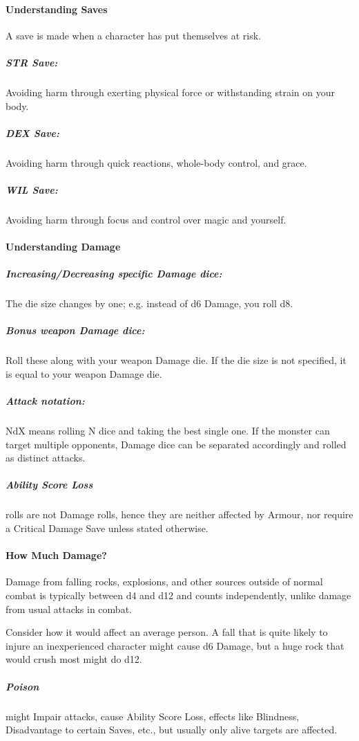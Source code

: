 \documentclass[itdr]{subfiles}
\begin{document}
\paragraph{Understanding Saves}
A save is made  when a character has put themselves at risk.

\subparagraph{STR Save:} Avoiding harm through exerting physical force or withstanding strain on your body.

\subparagraph{DEX Save:} Avoiding harm through quick reactions, whole-body control, and grace.

\subparagraph{WIL Save:} Avoiding harm through focus and control over magic and yourself.

\vfill
\break

\paragraph{Understanding Damage}
\subparagraph{Increasing/Decreasing specific Damage dice:} The die size changes by one; e.g. instead of d6 Damage, you roll d8.

\subparagraph{Bonus weapon Damage dice:} Roll these along with your weapon Damage die. If the die size is not \mbox{specified}, it is equal to your weapon Damage die.

\subparagraph{Attack notation:} NdX means rolling N dice and taking the best single one. If the monster can target multiple opponents, Damage dice can be separated accordingly and rolled as distinct attacks.

\subparagraph{Ability Score Loss} rolls are not Damage rolls, hence they are neither affected by Armour, nor require a Critical Damage Save unless stated otherwise.


\paragraph{How Much Damage?}
Damage from falling rocks, explosions, and other sources outside of normal combat is typically between d4 and d12 and counts independently, unlike damage from usual attacks in combat.

Consider how it would affect an average person. A fall that is quite likely to injure an inexperienced character might cause d6 Damage, but a huge rock that would crush most might do d12.

\subparagraph{Poison} might Impair attacks, cause Ability Score Loss, effects like Blindness, Disadvantage to certain Saves, etc., but usually only alive targets are affected.
\end{document}
